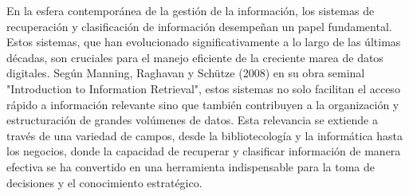 %
%
%
%

En la esfera contemporánea de la gestión de la información, los sistemas de recuperación y clasificación de información desempeñan un papel fundamental. Estos sistemas, que han evolucionado significativamente a lo largo de las últimas décadas, son cruciales para el manejo eficiente de la creciente marea de datos digitales. Según Manning, Raghavan y Schütze (2008) en su obra seminal "Introduction to Information Retrieval", estos sistemas no solo facilitan el acceso rápido a información relevante sino que también contribuyen a la organización y estructuración de grandes volúmenes de datos. Esta relevancia se extiende a través de una variedad de campos, desde la bibliotecología y la informática hasta los negocios, donde la capacidad de recuperar y clasificar información de manera efectiva se ha convertido en una herramienta indispensable para la toma de decisiones y el conocimiento estratégico.

